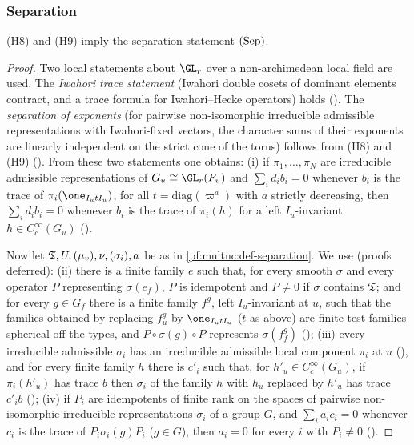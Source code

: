 \subsubsection*{Separation}

\begin{theorem}\label{pf:multnc:separation}
(H8) and (H9) imply the separation statement $\textup{(Sep)}$.
\end{theorem}

\begin{proof}
Two local statements about $\GL_r$ over a non-archimedean local field are used. The \emph{Iwahori trace statement} (Iwahori
double cosets of dominant elements contract, and a trace formula for Iwahori--Hecke operators) holds
(). The \emph{separation of exponents} (for pairwise non-isomorphic
irreducible admissible representations with Iwahori-fixed vectors, the character sums of their exponents are linearly
independent on the strict cone of the torus) follows from (H8) and (H9) ().
From these two statements one obtains:
(i) if $\pi_1,\dots,\pi_N$ are irreducible admissible representations of $G_u\cong\GL_r(F_u)$ and $\sum_id_ib_i=0$ whenever
$b_i$ is the trace of $\pi_i(\one_{I_utI_u})$, for all $t=\mathrm{diag}(\varpi^{a})$ with $a$ strictly decreasing, then
$\sum_id_ib_i=0$ whenever $b_i$ is the trace of $\pi_i(h)$ for a left $I_u$-invariant $h\in C_c^\infty(G_u)$
().

Now let $\mathfrak{T},U,(\mu_v),\nu,(\sigma_i),a$ be as in \cref{pf:multnc:def-separation}. We use (proofs deferred):
(ii) there is a finite family $e$ such that, for every smooth $\sigma$ and every operator $P$ representing $\sigma(e_f)$,
$P$ is idempotent and $P\ne0$ if $\sigma$ contains $\mathfrak{T}$; and for every $g\in G_f$ there is a finite family $f^{g}$,
left $I_u$-invariant at $u$, such that the families obtained by replacing $f^{g}_u$ by $\one_{I_utI_u}$ ($t$ as above) are
finite test families spherical off the types, and $P\circ\sigma(g)\circ P$ represents $\sigma(f^{g}_f)$
();
(iii) every irreducible admissible $\sigma_i$ has an irreducible admissible local component $\pi_i$ at $u$
(), and for every finite family $h$
there is $c'_i$ such that, for $h'_u\in C_c^\infty(G_u)$, if $\pi_i(h'_u)$ has trace $b$ then $\sigma_i$ of the family $h$
with $h_u$ replaced by $h'_u$ has trace $c'_ib$ ();
(iv) if $P_i$ are idempotents of finite rank on the spaces of pairwise non-isomorphic irreducible representations
$\sigma_i$ of a group $G$, and $\sum_ia_ic_i=0$ whenever $c_i$ is the trace of $P_i\sigma_i(g)P_i$ ($g\in G$), then $a_i=0$
for every $i$ with $P_i\ne0$ ().


\end{proof}
